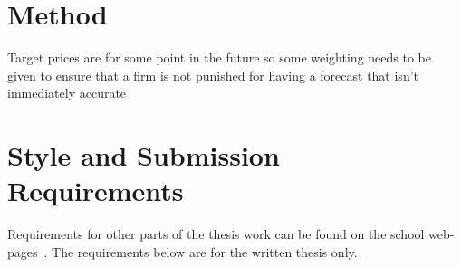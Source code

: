 \chapter{Method}
Target prices are for some point in the future so some weighting needs to be given to ensure that a firm is not punished for having a forecast that isn't immediately accurate







\chapter{Style and Submission Requirements}\label{ch:style}

Requirements for other parts of the thesis work can be found on the school
web-pages~\cite{Noo05}.  The requirements below are for the written thesis
only.

